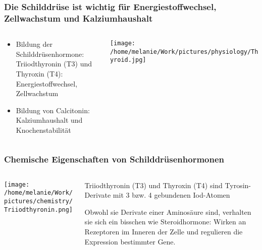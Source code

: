 \documentclass{beamer}
\begin{document}
\begin{frame}
\frametitle{Die Schilddrüse ist wichtig für Energiestoffwechsel, Zellwachstum und Kalziumhaushalt}

\begin{columns}[c]
\begin{column}{5cm}
\begin{itemize}
\item
Bildung der \textcolor{theme}{Schilddrüsenhormone}:\\
 Triiodthyronin (T3) und Thyroxin (T4): \\
Energiestoffwechsel, Zellwachstum
\item
Bildung von Calcitonin: \\ Kalziumhaushalt und Knochenstabilität

\end{itemize}

\end{column}

\begin{column}{5cm}

\texttt{[image: /home/melanie/Work/pictures/physiology/Thyroid.jpg]}

\end{column}

\end{columns}

\end{frame}






\begin{frame}
\frametitle{Chemische Eigenschaften von Schilddrüsenhormonen}



\begin{columns}[c]
\begin{column}{5cm}
\begin{center}
\texttt{[image: /home/melanie/Work/pictures/chemistry/Triiodthyronin.png]}
\end{center}
\end{column}
\begin{column}{5cm}
Triiodthyronin (T3) und Thyroxin (T4) sind Tyrosin-Derivate mit 3 bzw. 4 gebundenen Iod-Atomen \\[0.2 cm]
\pause

Obwohl sie Derivate einer Aminosäure sind, verhalten sie sich ein bisschen wie Steroidhormone: Wirken an Rezeptoren im Inneren der Zelle und regulieren die Expression bestimmter Gene.  

\end{column}
\end{columns}

\end{frame}
\end{document}

